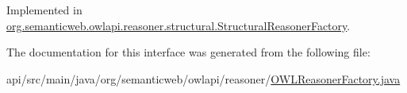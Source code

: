 Implemented in \hyperlink{classorg_1_1semanticweb_1_1owlapi_1_1reasoner_1_1structural_1_1_structural_reasoner_factory_aee6fd6d27fd4f29246797c8e279b59f8}{org.\-semanticweb.\-owlapi.\-reasoner.\-structural.\-Structural\-Reasoner\-Factory}.



The documentation for this interface was generated from the following file\-:\begin{DoxyCompactItemize}
\item 
api/src/main/java/org/semanticweb/owlapi/reasoner/\hyperlink{_o_w_l_reasoner_factory_8java}{O\-W\-L\-Reasoner\-Factory.\-java}\end{DoxyCompactItemize}
